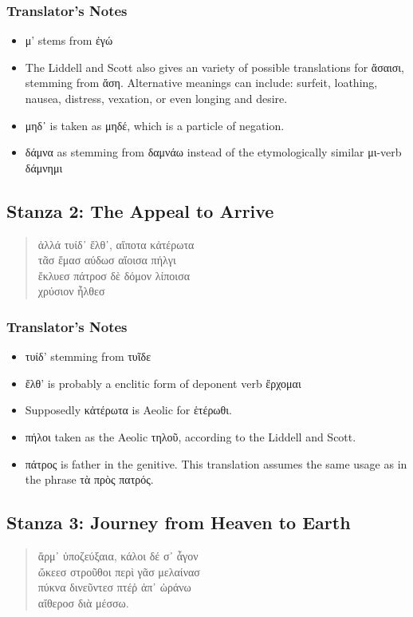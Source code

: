 \subsubsection*{Translator's Notes}
\begin{itemize}
  \item μ' stems from ἐγώ
  \item The Liddell and Scott also gives an variety of possible translations for ἄσαισι, stemming from ἄση. Alternative meanings can include: surfeit, loathing, nausea, distress, vexation, or even longing and desire.
  \item μηδ᾽ is taken as μηδέ, which is a particle of negation.
  \item δάμνα as stemming from δαμνάω instead of the etymologically similar μι-verb δάμνημι
\end{itemize}

\subsection*{Stanza 2: The Appeal to Arrive}
\begin{quote}
  ἀλλά τυίδ᾽ ἔλθ᾽, αἴποτα κἀτέρωτα\\
  τᾶσ ἔμασ αύδωσ αἴοισα πήλγι\\
  ἔκλυεσ πάτροσ δὲ δόμον λίποισα\\
  χρύσιον ἦλθεσ
\end{quote}

\subsubsection*{Translator's Notes}
\begin{itemize}
  \item τυίδ' stemming from τυῖδε
  \item ἔλθ' is probably a enclitic form of deponent verb ἔρχομαι
  \item Supposedly κἀτέρωτα is Aeolic for ἑτέρωθι.
  \item πήλοι taken as the Aeolic τηλοῦ, according to the Liddell and Scott.
  \item πάτρος is father in the genitive. This translation assumes the same usage as in the phrase τὰ πρὸς πατρός.
\end{itemize}

\subsection*{Stanza 3: Journey from Heaven to Earth}
\begin{quote}
  ἄρμ᾽ ὐποζεύξαια, κάλοι δέ σ᾽ ἆγον\\
  ὤκεεσ στροῦθοι περὶ γᾶσ μελαίνασ\\
  πύκνα δινεῦντεσ πτέῤ ἀπ᾽ ὠράνω\\
  αἴθεροσ διὰ μέσσω.
\end{quote}

